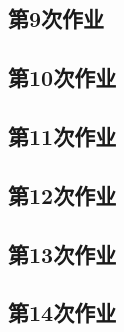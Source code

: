 \documentclass[a4paper, draft]{article}
\begin{document}


\subsection{第9次作业}



\subsection{第10次作业}



\subsection{第11次作业}



\subsection{第12次作业}



\subsection{第13次作业}



\subsection{第14次作业}


\end{document}
